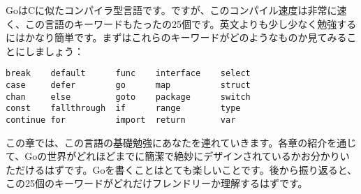GoはCに似たコンパイラ型言語です。ですが、このコンパイル速度は非常に速く、この言語のキーワードもたったの25個です。英文よりも少し少なく勉強するにはかなり簡単です。まずはこれらのキーワードがどのようなものか見てみることにしましょう：

\begin{lstlisting}[numbers=none]
break    default      func    interface    select
case     defer        go      map          struct
chan     else         goto    package      switch
const    fallthrough  if      range        type
continue for          import  return       var
\end{lstlisting}

この章では、この言語の基礎勉強にあなたを連れていきます。各章の紹介を通じて、Goの世界がどれほどまでに簡潔で絶妙にデザインされているかお分かりいただけるはずです。Goを書くことはとても楽しいことです。後から振り返ると、この25個のキーワードがどれだけフレンドリーか理解するはずです。
